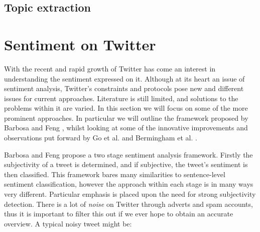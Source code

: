 \begin{comment}

Using adverbs for grading - Benamara et al. \cite{Benamara:2007wz} 

Subjectivity does not necessarily imply a polarised opinion

Broad overview in \cite{Pang:2008wj}

Phrase level sentiment analysis \cite{Wilson:2005tt}

Movie reviews, thumbs up/down \cite{Turney:2002vv} \cite{Pang:2002tu}

\end{comment}

\subsection{Topic extraction}
\label{background:topic_extraction}

\begin{comment}
	2 pass system
		- first look for topic
		- then measure sentiment accordingly
		- Ounis et al. \cite{Macdonald:2007vu}
		- Hurst and Nigam \cite{Nigam:2004ur}, \cite{Nigam:2004vw}
\end{comment}

\section{Sentiment on Twitter}
\label{background:sentiment_on_twitter}

With the recent and rapid growth of Twitter has come an interest in understanding the sentiment expressed on it. Although at its heart an issue of sentiment analysis, Twitter's constraints and protocols pose new and different issues for current approaches. Literature is still limited, and solutions to the problems within it are varied. In this section we will focus on some of the more prominent approaches. In particular we will outline the framework proposed by Barbosa and Feng \cite{Barbosa:ws}, whilst looking at some of the innovative improvements and observations put forward by Go et al. \cite{Go:2009ut} and Bermingham et al. \cite{Bermingham:2010vh}.

Barbosa and Feng \cite{Barbosa:ws} propose a two stage sentiment analysis framework. Firstly the subjectivity of a tweet is determined, and if subjective, the tweet's sentiment is then classified. This framework bares many similarities to sentence-level sentiment classification, however the approach within each stage is in many ways very different. Particular emphasis is placed upon the need for strong subjectivity detection. There is a lot of \emph{noise} on Twitter through adverts and spam accounts, thus it is important to filter this out if we ever hope to obtain an accurate overview. A typical noisy tweet might be:

